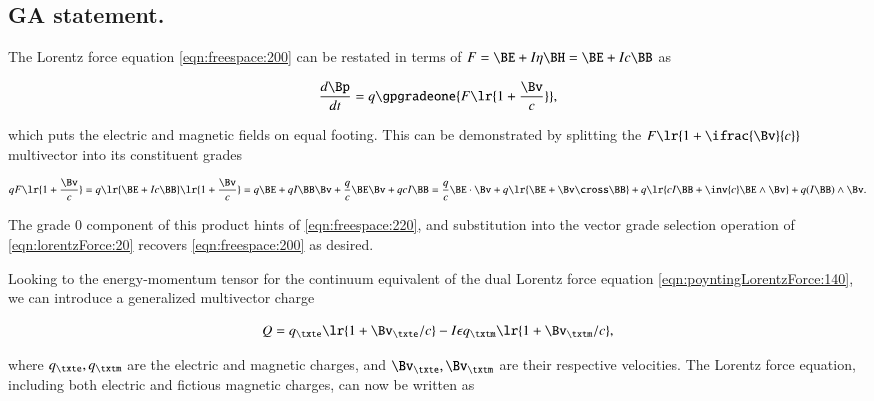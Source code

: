 %
%
\subsection{GA statement.}
The Lorentz force equation \cref{eqn:freespace:200}
can be restated
in terms of \( F = \BE + I \eta \BH = \BE + I c \BB \) as

\begin{dmath}\label{eqn:lorentzForce:20}
\frac{d\Bp}{dt} = q \gpgradeone{ F \lr{ 1 + \frac{\Bv}{c} } },
\end{dmath}

which puts the electric and magnetic fields on equal footing.
This can be demonstrated by splitting the \( F \lr{ 1 + \ifrac{\Bv}{c} } \) multivector into its constituent grades

\begin{dmath}\label{eqn:lorentzForce:40}
q F \lr{ 1 + \frac{\Bv}{c} }
=
q
\lr{ \BE + I c \BB }
\lr{ 1 + \frac{\Bv}{c} }
=
q \BE
+ q I \BB \Bv
+ \frac{q}{c} \BE \Bv
+ q c I \BB
=
  \frac{q}{c} \BE \cdot \Bv
+ q \lr{ \BE + \Bv \cross \BB }
+ q \lr{ c I \BB + \inv{c} \BE \wedge \Bv }
+ q (I \BB) \wedge \Bv.
\end{dmath}

The grade 0 component of this product hints of \cref{eqn:freespace:220}, and substitution into the vector grade selection operation of \cref{eqn:lorentzForce:20} recovers \cref{eqn:freespace:200} as desired.

Looking to the energy-momentum tensor for the continuum equivalent of the dual Lorentz force equation \cref{eqn:poyntingLorentzForce:140}, we can introduce a generalized multivector charge

\begin{dmath}\label{eqn:lorentzForce:240}
Q =
q_\txte \lr{ 1 + \Bv_\txte/c }
-I \epsilon q_\txtm \lr{ 1 + \Bv_\txtm/c },
\end{dmath}

where \( q_\txte, q_\txtm \) are the electric and magnetic charges, and \( \Bv_\txte, \Bv_\txtm \) are their respective velocities.
The Lorentz force equation, including both electric and fictious magnetic charges, can now be written as

